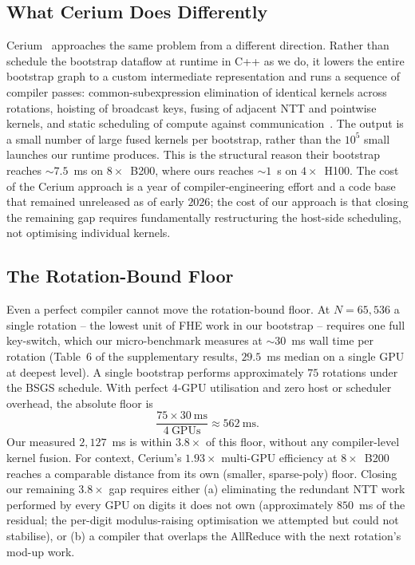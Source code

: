 \documentclass[conference]{IEEEtran}
\begin{document}
\subsection{What Cerium Does Differently}

Cerium~\cite{Jayashankar2025-arxiv} approaches the same problem from a
different direction. Rather than schedule the bootstrap dataflow at
runtime in C++ as we do, it lowers the entire bootstrap graph to a
custom intermediate representation and runs a sequence of compiler
passes: common-subexpression elimination of identical kernels across
rotations, hoisting of broadcast keys, fusing of adjacent NTT and
pointwise kernels, and static scheduling of compute against
communication~\cite{Jayashankar2025-asplos}. The output is a small
number of large fused kernels per bootstrap, rather than the $10^{5}$
small launches our runtime produces. This is the structural reason
their bootstrap reaches $\sim 7.5$~ms on $8\times$~B200, where ours
reaches $\sim 1$~s on $4\times$~H100. The cost of the Cerium approach
is a year of compiler-engineering effort and a code base that
remained unreleased as of early $2026$; the cost of our approach is
that closing the remaining gap requires fundamentally restructuring
the host-side scheduling, not optimising individual kernels.

\subsection{The Rotation-Bound Floor}

Even a perfect compiler cannot move the rotation-bound floor. At
$N{=}65{,}536$ a single rotation -- the lowest unit of FHE work in our
bootstrap -- requires one full key-switch, which our micro-benchmark
measures at $\sim 30$~ms wall time per rotation
(Table~6 of the supplementary results, $29.5$~ms median on a single
GPU at deepest level). A single bootstrap performs approximately $75$
rotations under the BSGS schedule. With perfect $4$-GPU utilisation
and zero host or scheduler overhead, the absolute floor is
\[
\frac{75 \times 30~\mathrm{ms}}{4 ~\text{GPUs}} \approx 562~\mathrm{ms}.
\]
Our measured $2{,}127$~ms is within $3.8\times$ of this floor,
without any compiler-level kernel fusion. For context, Cerium's
$1.93\times$ multi-GPU efficiency at $8\times$~B200 reaches a comparable
distance from its own (smaller, sparse-poly) floor. Closing our
remaining $3.8\times$ gap requires either (a) eliminating the redundant
NTT work performed by every GPU on digits it does not own
(approximately $850$~ms of the residual; the per-digit modulus-raising
optimisation we attempted but could not stabilise), or (b) a compiler
that overlaps the AllReduce with the next rotation's mod-up work.
\end{document}
